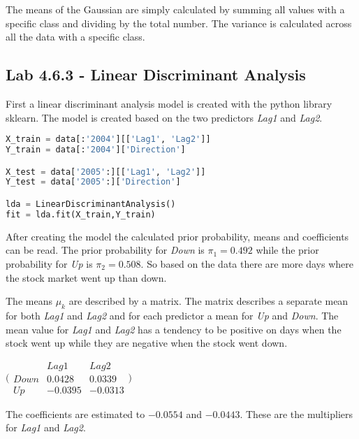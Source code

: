 The means of the Gaussian are simply calculated by summing all values with a specific class and dividing by the total number.
The variance is calculated across all the data with a specific class.

\subsection{Lab 4.6.3 - Linear Discriminant Analysis}
First a linear discriminant analysis model is created with the python library sklearn. The model is created based on the two predictors \emph{Lag1} and \emph{Lag2}. 


\begin{lstlisting}[language=Python, label=lst:ldaModel, caption=Creating linear discriminant analysis model sklearn]
X_train = data[:'2004'][['Lag1', 'Lag2']]
Y_train = data[:'2004']['Direction']

X_test = data['2005':][['Lag1', 'Lag2']]
Y_test = data['2005':]['Direction']

lda = LinearDiscriminantAnalysis()
fit = lda.fit(X_train,Y_train)
\end{lstlisting}

After creating the model the calculated prior probability, means and coefficients can be read. The prior probability for \emph{Down} is $\pi_1=0.492$ while the prior probability for \emph{Up} is $\pi_2=0.508$. So based on the data there are more days where the stock market went up than down. 

The means $\mu_k$ are described by a matrix. The matrix describes a separate mean for both \emph{Lag1} and \emph{Lag2} and for each predictor a mean for \emph{Up} and \emph{Down}. The mean value for \emph{Lag1} and \emph{Lag2} has a tendency to be positive on days when the stock went up while they are negative when the stock went down.  

\begin{center}
	$\bigl( \begin{smallmatrix} 	 & Lag1 & Lag2	\\ 	 Down & 0.0428 & 0.0339 \\ 	 Up & -0.0395 & -0.0313 \end{smallmatrix} \bigr) $
\end{center}


The coefficients are estimated to $-0.0554$ and $-0.0443$. These are the multipliers for \emph{Lag1} and \emph{Lag2}.

%
%

